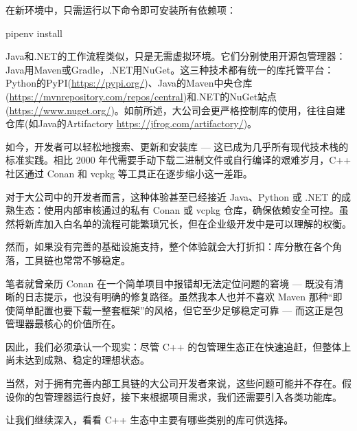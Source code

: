 在新环境中，只需运行以下命令即可安装所有依赖项：

\begin{shell}
pipenv install
\end{shell}

Java和.NET的工作流程类似，只是无需虚拟环境。它们分别使用开源包管理器：Java用Maven或Gradle，.NET用NuGet。这三种技术都有统一的库托管平台：Python的PyPI(\url{https://pypi.org/})、Java的Maven中央仓库(\url{https://mvnrepository.com/repos/central})和.NET的NuGet站点(\url{https://www.nuget.org/})。如前所述，大公司会更严格控制库的使用，往往自建仓库(如Java的Artifactory \url{https://jfrog.com/artifactory/})。

如今，开发者可以轻松地搜索、更新和安装库 --- 这已成为几乎所有现代技术栈的标准实践。相比 2000 年代需要手动下载二进制文件或自行编译的艰难岁月，C++ 社区通过 Conan 和 vcpkg 等工具正在逐步缩小这一差距。

对于大公司中的开发者而言，这种体验甚至已经接近 Java、Python 或 .NET 的成熟生态：使用内部审核通过的私有 Conan 或 vcpkg 仓库，确保依赖安全可控。虽然将新库加入白名单的流程可能繁琐冗长，但在企业级开发中是可以理解的权衡。

然而，如果没有完善的基础设施支持，整个体验就会大打折扣：库分散在各个角落，工具链也常常不够稳定。

笔者就曾亲历 Conan 在一个简单项目中报错却无法定位问题的窘境 --- 既没有清晰的日志提示，也没有明确的修复路径。虽然我本人也并不喜欢 Maven 那种“即使简单配置也要下载一整套框架”的风格，但它至少足够稳定可靠 --- 而这正是包管理器最核心的价值所在。

因此，我们必须承认一个现实：尽管 C++ 的包管理生态正在快速追赶，但整体上尚未达到成熟、稳定的理想状态。

当然，对于拥有完善内部工具链的大公司开发者来说，这些问题可能并不存在。假设你的包管理器运行良好，接下来根据项目需求，我们还需要引入各类功能库。

让我们继续深入，看看 C++ 生态中主要有哪些类别的库可供选择。



